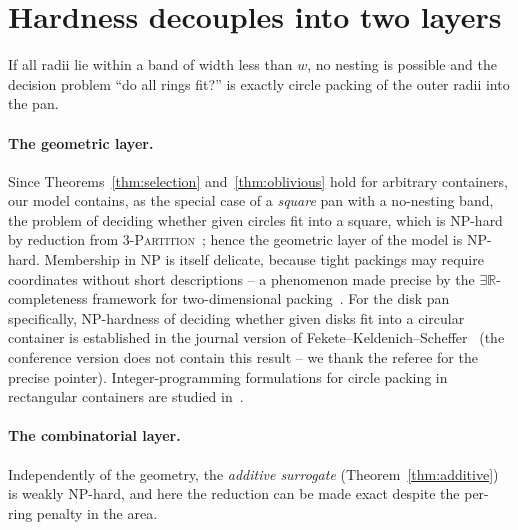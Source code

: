 \documentclass[11pt]{article}
\theoremstyle{definition}
\begin{document}
\FloatBarrier
\section{Hardness decouples into two layers}\label{sec:hardness}

If all radii lie within a band of width less than $w$, no nesting is
possible and the decision problem ``do all rings fit?'' is exactly circle
packing of the outer radii into the pan.

\paragraph{The geometric layer.}
Since Theorems~\ref{thm:selection} and~\ref{thm:oblivious} hold for
arbitrary containers, our model contains, as the special case of a
\emph{square} pan with a no-nesting band, the problem of deciding whether
given circles fit into a square, which is NP-hard by reduction from
3-\textsc{Partition}~\cite{DemaineFeketeLang2010}; hence the geometric layer
of the model is NP-hard. Membership in NP is itself delicate, because tight
packings may require coordinates without short descriptions -- a phenomenon
made precise by the $\exists\mathbb R$-completeness framework for
two-dimensional packing~\cite{AbrahamsenMiltzowSeiferth2020}. For the disk
pan specifically, NP-hardness of deciding whether given disks fit into a
circular container is established in the journal version of
Fekete--Keldenich--Scheffer~\cite[Theorem~5.1]{FeketeKeldenichScheffer2019}
(the conference version does not contain this result -- we thank the
referee for the precise pointer). Integer-programming
formulations for circle packing in rectangular containers are studied
in~\cite{Litvinchev2014}.

\paragraph{The combinatorial layer.}
Independently of the geometry, the \emph{additive surrogate}
(Theorem~\ref{thm:additive}) is weakly NP-hard, and here the reduction can
be made exact despite the per-ring penalty in the area.
\end{document}
